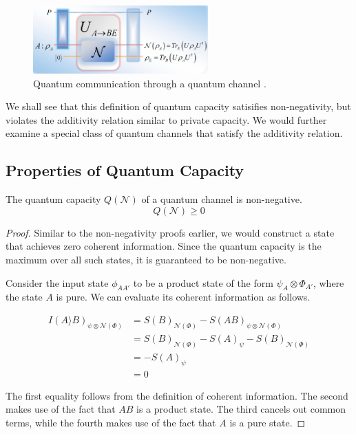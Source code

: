\begin{figure}[H]
    \centering
    \includegraphics[width=0.6\textwidth]{figures/quantum_communication_quantum_channel.png}
    \caption{Quantum communication through a quantum channel \cite{Gyongyosi_2018}.}
\end{figure}

We shall see that this definition of quantum capacity satisifies non-negativity, but violates the additivity relation similar to private capacity. We would further examine a special class of quantum channels that satisfy the additivity relation.

\subsection{Properties of Quantum Capacity}

\begin{theorem}
The quantum capacity $Q(\mathcal{N})$ of a quantum channel is non-negative.
$$Q(\mathcal{N}) \geq 0$$
\end{theorem}

\begin{proof}
Similar to the non-negativity proofs earlier, we would construct a state that achieves zero coherent information. Since the quantum capacity is the maximum over all such states, it is guaranteed to be non-negative.

Consider the input state $\phi_{AA'}$ to be a product state of the form $\psi_A \otimes \Phi_{A'}$, where the state $A$ is pure. We can evaluate its coherent information as follows.

\begin{align*}
I(A \rangle B)_{\psi \otimes \mathcal{N}(\Phi)} &= S(B)_{\mathcal{N}(\Phi)} - S(AB)_{\psi \otimes \mathcal{N}(\Phi)} \\
&= S(B)_{\mathcal{N}(\Phi)} - S(A)_{\psi} - S(B)_{\mathcal{N}(\Phi)} \\
&= - S(A)_{\psi} \\
&= 0
\end{align*}

The first equality follows from the definition of coherent information. The second makes use of the fact that $AB$ is a product state. The third cancels out common terms, while the fourth makes use of the fact that $A$ is a pure state.
\end{proof}

